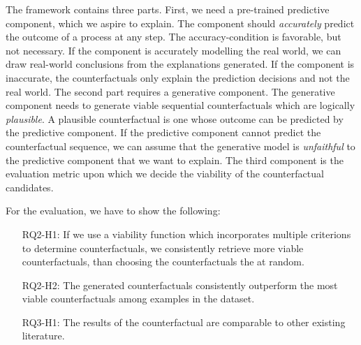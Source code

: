 \documentclass[./../../paper.tex]{subfiles}
\begin{document}
\noindent The framework contains three parts. First, we need a pre-trained predictive component, which we aspire to explain. The component should \emph{accurately} predict the outcome of a process at any step. The accuracy-condition is favorable, but not necessary. If the component is accurately modelling the real world, we can draw real-world conclusions from the explanations generated. If the component is inaccurate, the counterfactuals only explain the prediction decisions and not the real world. The second part requires a generative component. The generative component needs to generate viable sequential counterfactuals which are logically \emph{plausible}. A plausible counterfactual is one whose outcome can be  predicted by the predictive component. If the predictive component cannot predict the counterfactual sequence, we can assume that the generative model is \emph{unfaithful} to the predictive component that we want to explain. The third component is the evaluation metric upon which we decide the viability of the counterfactual candidates.

For the evaluation, we have to show the following:
\begin{itemize}
    \item[RQ2-H1:] If we use a viability function which incorporates multiple criterions to determine counterfactuals, we consistently retrieve more viable counterfactuals, than choosing the counterfactuals the at random.
    \item[RQ2-H2:] The generated counterfactuals consistently outperform the most viable counterfactuals among examples in the dataset.
    \item[RQ3-H1:] The results of the counterfactual are comparable to other existing literature.
\end{itemize}
\end{document}
